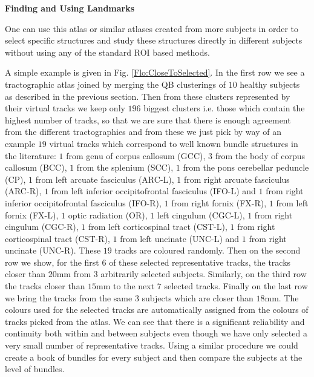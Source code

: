 \documentclass[preprint,authoryear,a4paper,10pt,onecolumn]{elsarticle}
\begin{document}
\textbf{Finding and Using Landmarks}

One can use this atlas or similar atlases created from more subjects in
order to select specific structures and study these structures directly
in different subjects without using any of the standard ROI based
methods.

A simple example is given in Fig. \ref{Flo:CloseToSelected}. In the
first row we see a tractographic atlas joined by merging the QB
clusterings of $10$ healthy subjects as described in the previous
section. Then from these clusters represented by their virtual tracks we
keep only $196$ biggest clusters i.e. those which contain the highest
number of tracks, so that we are sure that there is enough agreement
from the different tractographies and from these we just pick by way of
an example $19$ virtual tracks which correspond to well known bundle
structures in the literature: $1$ from genu of corpus callosum (GCC),
$3$ from the body of corpus callosum (BCC), $1$ from the splenium (SCC),
$1$ from the pons cerebellar peduncle (CP), $1$ from left arcuate
fasciculus (ARC-L), $1$ from right arcuate fasciculus (ARC-R), $1$ from
left inferior occipitofrontal fasciculus (IFO-L) and $1$ from right
inferior occipitofrontal fasciculus (IFO-R), $1$ from right fornix
(FX-R), $1$ from left fornix (FX-L), $1$ optic radiation (OR), $1$ left
cingulum (CGC-L), $1$ from right cingulum (CGC-R), $1$ from left
corticospinal tract (CST-L), $1$ from right corticospinal tract (CST-R),
$1$ from left uncinate (UNC-L) and $1$ from right uncinate
(UNC-R). These $19$ tracks are coloured randomly. Then on the second row
we show, for the first $6$ of these selected representative tracks, the
tracks closer than $20$mm from $3$ arbitrarily selected
subjects. Similarly, on the third row the tracks closer than $15$mm to
the next $7$ selected tracks. Finally on the last row we bring the
tracks from the same $3$ subjects which are closer than $18$mm.  The
colours used for the selected tracks are automatically assigned from the
colours of tracks picked from the atlas. We can see that there is a
significant reliability and continuity both within and between subjects
even though we have only selected a very small number of representative
tracks. Using a similar procedure we could create a book of bundles for
every subject and then compare the subjects at the level of bundles.
\end{document}
